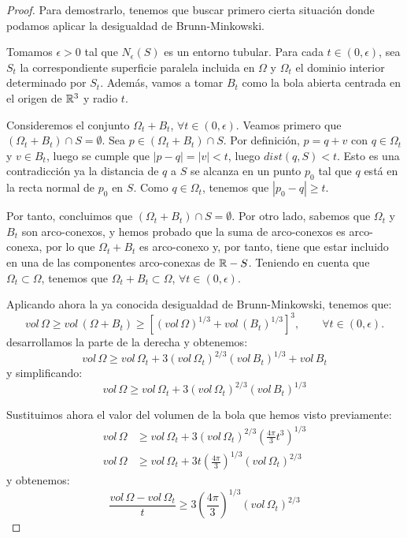 \begin{proof}
Para demostrarlo, tenemos que buscar primero cierta situación donde podamos aplicar la desigualdad de Brunn-Minkowski.

Tomamos $\epsilon > 0$ tal que $N_\epsilon(S)$ es un entorno tubular. Para cada $t \in (0, \epsilon)$, sea $S_t$ la correspondiente superficie paralela incluida en $\Omega$ y $\Omega_t$ el dominio interior determinado por $S_t$. Además, vamos a tomar $B_t$ como la bola abierta centrada en el origen de $\mathbb{R}^3$ y radio $t$.

Consideremos el conjunto $\Omega_t + B_t$, $\forall t \in (0, \epsilon)$. Veamos primero que $(\Omega_t + B_t) \cap S = \emptyset$. Sea $p \in (\Omega_t + B_t) \cap S$. Por definición, $p = q + v$ con $q \in \Omega_t$ y $v \in B_t$, luego se cumple que $|p - q| = |v| < t$, luego $dist(q, S) < t$. Esto es una contradicción ya la distancia de $q$ a $S$ se alcanza en un punto $p_0$ tal que $q$ está en la recta normal de $p_0$ en $S$. Como $q \in \Omega_t$, tenemos que $|p_0 - q| \geq t$.

Por tanto, concluimos que $(\Omega_t + B_t) \cap S = \emptyset$. Por otro lado, sabemos que $\Omega_t$ y $B_t$ son arco-conexos, y hemos probado que la suma de arco-conexos es arco-conexa, por lo que $\Omega_t + B_t$ es arco-conexo y, por tanto, tiene que estar incluido en una de las componentes arco-conexas de $\mathbb{R} - S$. Teniendo en cuenta que $\Omega_t \subset \Omega$, tenemos que $\Omega_t + B_t \subset \Omega$, $\forall t \in (0, \epsilon)$.

Aplicando ahora la ya conocida desigualdad de Brunn-Minkowski, tenemos que:
%
\begin{equation*}
    vol \, \Omega \geq vol \, (\Omega + B_t) \geq \left[ (vol \, \Omega)^{1/3} + vol \, (B_t)^{1/3} \right]^3, \qquad \forall t \in (0, \epsilon).
\end{equation*}
%
desarrollamos la parte de la derecha y obtenemos:
%
\begin{equation*}
    vol \, \Omega \geq vol \, \Omega_t + 3(vol \, \Omega_t)^{2/3}(vol \, B_t)^{1/3} + vol \, B_t
\end{equation*}
%
y simplificando:
%
\begin{equation*}
    vol \, \Omega \geq vol \, \Omega_t + 3(vol \, \Omega_t)^{2/3}(vol \, B_t)^{1/3}
\end{equation*}

Sustituimos ahora el valor del volumen de la bola que hemos visto previamente:
%
\begin{align*}
    vol \, \Omega &\geq vol \, \Omega_t + 3(vol \, \Omega_t)^{2/3} \left( \frac{4\pi}{3}t^3 \right)^{1/3} \\
    vol \, \Omega &\geq vol \, \Omega_t + 3t \left( \frac{4\pi}{3} \right)^{1/3} (vol \, \Omega_t)^{2/3}
\end{align*}
%
y obtenemos:
%
\begin{equation*}
    \frac{vol \, \Omega - vol \, \Omega_t}{t} \geq 3 \left( \frac{4\pi}{3} \right)^{1/3} (vol \, \Omega_t)^{2/3}
\end{equation*}


\end{proof}
